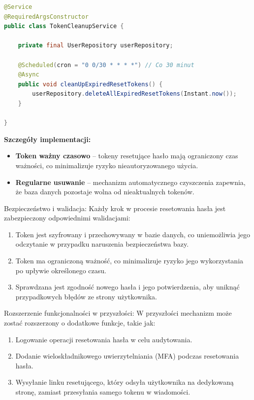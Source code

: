 \begin{lstlisting}[language=Java, caption=Usługa czyszczenia wygasłych tokenów \texttt{TokenCleanupService}]
@Service
@RequiredArgsConstructor
public class TokenCleanupService {

    private final UserRepository userRepository;

    @Scheduled(cron = "0 0/30 * * * *") // Co 30 minut
    @Async
    public void cleanUpExpiredResetTokens() {
        userRepository.deleteAllExpiredResetTokens(Instant.now());
    }

}
\end{lstlisting}

\textbf{Szczegóły implementacji:}
\begin{itemize}
    \item \textbf{Token ważny czasowo} -- tokeny resetujące hasło mają ograniczony czas ważności, co minimalizuje ryzyko nieautoryzowanego użycia.
    \item \textbf{Regularne usuwanie} -- mechanizm automatycznego czyszczenia zapewnia, że baza danych pozostaje wolna od nieaktualnych tokenów.
\end{itemize}

Bezpieczeństwo i walidacja:
Każdy krok w procesie resetowania hasła jest zabezpieczony odpowiednimi walidacjami:
\begin{enumerate}
    \item Token jest szyfrowany i przechowywany w bazie danych, co uniemożliwia jego odczytanie w przypadku naruszenia bezpieczeństwa bazy.
    \item Token ma ograniczoną ważność, co minimalizuje ryzyko jego wykorzystania po upływie określonego czasu.
    \item Sprawdzana jest zgodność nowego hasła i jego potwierdzenia, aby uniknąć przypadkowych błędów ze strony użytkownika.
\end{enumerate}

Rozszerzenie funkcjonalności w przyszłości:
W przyszłości mechanizm może zostać rozszerzony o dodatkowe funkcje, takie jak:
\begin{enumerate}
    \item Logowanie operacji resetowania hasła w celu audytowania.
    \item Dodanie wieloskładnikowego uwierzytelniania (MFA) podczas resetowania hasła.
    \item Wysyłanie linku resetującego, który odsyła użytkownika na dedykowaną stronę, zamiast przesyłania samego tokenu w wiadomości.
\end{enumerate}

